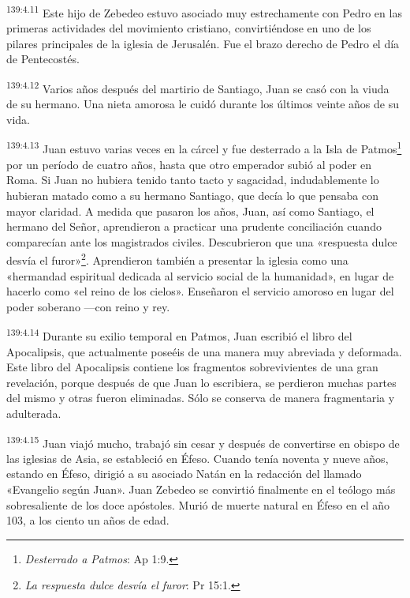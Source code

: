 \par
\textsuperscript{139:4.11} Este hijo de Zebedeo estuvo asociado muy estrechamente con Pedro en las primeras actividades del movimiento cristiano, convirtiéndose en uno de los pilares principales de la iglesia de Jerusalén. Fue el brazo derecho de Pedro el día de Pentecostés.

\par
\textsuperscript{139:4.12} Varios años después del martirio de Santiago, Juan se casó con la viuda de su hermano. Una nieta amorosa le cuidó durante los últimos veinte años de su vida.

\par
\textsuperscript{139:4.13} Juan estuvo varias veces en la cárcel y fue desterrado a la Isla de Patmos\footnote{\textit{Desterrado a Patmos}: Ap 1:9.} por un período de cuatro años, hasta que otro emperador subió al poder en Roma. Si Juan no hubiera tenido tanto tacto y sagacidad, indudablemente lo hubieran matado como a su hermano Santiago, que decía lo que pensaba con mayor claridad. A medida que pasaron los años, Juan, así como Santiago, el hermano del Señor, aprendieron a practicar una prudente conciliación cuando comparecían ante los magistrados civiles. Descubrieron que una «respuesta dulce desvía el furor»\footnote{\textit{La respuesta dulce desvía el furor}: Pr 15:1.}. Aprendieron también a presentar la iglesia como una «hermandad espiritual dedicada al servicio social de la humanidad», en lugar de hacerlo como «el reino de los cielos». Enseñaron el servicio amoroso en lugar del poder soberano ---con reino y rey.

\par
\textsuperscript{139:4.14} Durante su exilio temporal en Patmos, Juan escribió el libro del Apocalipsis, que actualmente poseéis de una manera muy abreviada y deformada. Este libro del Apocalipsis contiene los fragmentos sobrevivientes de una gran revelación, porque después de que Juan lo escribiera, se perdieron muchas partes del mismo y otras fueron eliminadas. Sólo se conserva de manera fragmentaria y adulterada.

\par
\textsuperscript{139:4.15} Juan viajó mucho, trabajó sin cesar y después de convertirse en obispo de las iglesias de Asia, se estableció en Éfeso. Cuando tenía noventa y nueve años, estando en Éfeso, dirigió a su asociado Natán en la redacción del llamado «Evangelio según Juan». Juan Zebedeo se convirtió finalmente en el teólogo más sobresaliente de los doce apóstoles. Murió de muerte natural en Éfeso en el año 103, a los ciento un años de edad.


